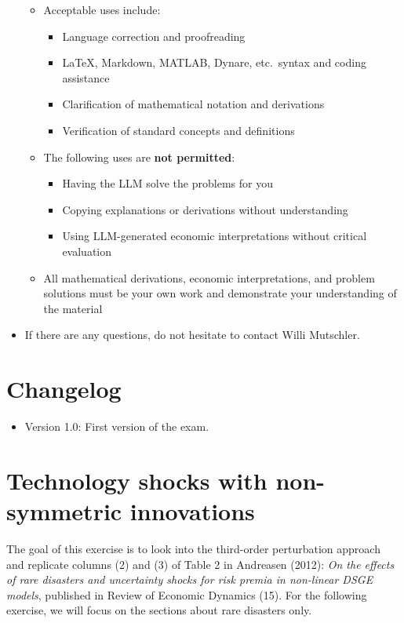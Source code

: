 \documentclass{article}
\numberwithin{equation}{section}
\begin{document}
\begin{itemize}
\begin{itemize}
    \item Acceptable uses include:
      \begin{itemize}
        \item Language correction and proofreading
        \item LaTeX, Markdown, MATLAB, Dynare, etc.\ syntax and coding assistance
        \item Clarification of mathematical notation and derivations
        \item Verification of standard concepts and definitions
      \end{itemize}
    \item The following uses are \textbf{not permitted}:
      \begin{itemize}
        \item Having the LLM solve the problems for you
        \item Copying explanations or derivations without understanding
        \item Using LLM-generated economic interpretations without critical evaluation
      \end{itemize}
    \item All mathematical derivations, economic interpretations, and problem solutions must be your own work and demonstrate your understanding of the material
    
  \end{itemize}
\item
If there are any questions, do not hesitate to contact Willi Mutschler.
\end{itemize}

\section*{Changelog}
\begin{itemize}
\item Version 1.0: First version of the exam.
\end{itemize}

\newpage

\section[Technology shocks with non-symmetric innovations]{Technology shocks with non-symmetric innovations\label{ex:Andreasen_2012}}
The goal of this exercise is to look into the third-order perturbation approach and replicate columns (2) and (3) of Table 2 in Andreasen (2012):
  \emph{On the effects of rare disasters and uncertainty shocks for risk premia in non-linear DSGE models},
  published in Review of Economic Dynamics (15).
For the following exercise, we will focus on the sections about rare disasters only.
\end{document}
